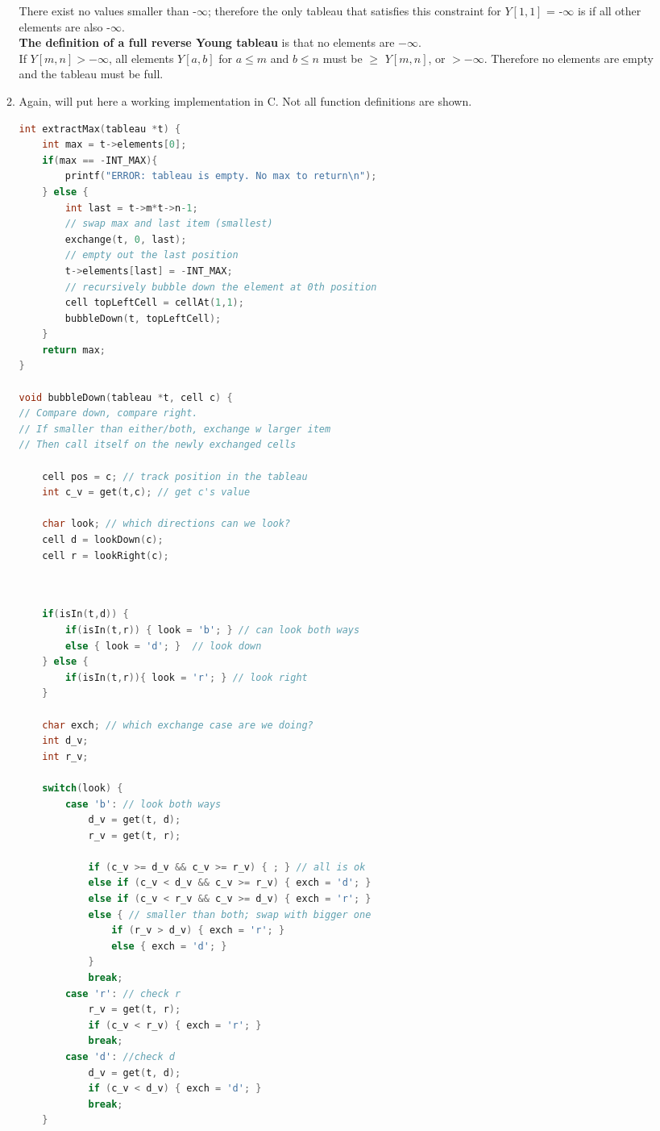 \documentclass{article}
\begin{document}
\begin{enumerate}
\begin{enumerate}
	There exist no values smaller than -$\infty$; therefore the only tableau that satisfies this constraint for $Y[1,1]$ = -$\infty$ is if all other elements are also -$\infty$.\\
	
	\textbf{The definition of a full reverse Young tableau} is that no elements are $-\infty$. \\
	
	If $Y[m,n] > -\infty$, all elements $Y[a,b]$ for $a\leq m$ and $b\leq n$ must be $\geq$ $Y[m,n]$, or $> -\infty$. Therefore no elements are empty and the tableau must be full.
	
	\item Again, will put here a working implementation in C. Not all function definitions are shown.
	
	\begin{lstlisting}[language=C, style=CStyle]
int extractMax(tableau *t) {
	int max = t->elements[0];
	if(max == -INT_MAX){
		printf("ERROR: tableau is empty. No max to return\n");
	} else {
		int last = t->m*t->n-1;
		// swap max and last item (smallest)
		exchange(t, 0, last);
		// empty out the last position
		t->elements[last] = -INT_MAX;
		// recursively bubble down the element at 0th position
		cell topLeftCell = cellAt(1,1);
		bubbleDown(t, topLeftCell);
	}
	return max;	
}

void bubbleDown(tableau *t, cell c) {
// Compare down, compare right. 
// If smaller than either/both, exchange w larger item
// Then call itself on the newly exchanged cells

	cell pos = c; // track position in the tableau
	int c_v = get(t,c); // get c's value

	char look; // which directions can we look?
	cell d = lookDown(c);
	cell r = lookRight(c);
	
	\end{lstlisting}
	\newpage
	\begin{lstlisting}[language=C, style=CStyle]
	
	if(isIn(t,d)) {
		if(isIn(t,r)) { look = 'b'; } // can look both ways
		else { look = 'd'; }  // look down
	} else {
		if(isIn(t,r)){ look = 'r'; } // look right
	}

	char exch; // which exchange case are we doing?
	int d_v;
	int r_v;

	switch(look) {
		case 'b': // look both ways
			d_v = get(t, d);
			r_v = get(t, r);

			if (c_v >= d_v && c_v >= r_v) { ; } // all is ok
			else if (c_v < d_v && c_v >= r_v) { exch = 'd'; }	
			else if (c_v < r_v && c_v >= d_v) { exch = 'r'; }
			else { // smaller than both; swap with bigger one
				if (r_v > d_v) { exch = 'r'; }
				else { exch = 'd'; }
			}
			break;
		case 'r': // check r
			r_v = get(t, r);
			if (c_v < r_v) { exch = 'r'; }
			break;
		case 'd': //check d
			d_v = get(t, d);
			if (c_v < d_v) { exch = 'd'; }
			break;
	}


\end{lstlisting}
\end{enumerate}
\end{enumerate}
\end{document}
